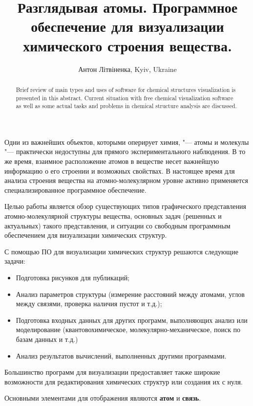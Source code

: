 \documentclass[10pt, a5paper]{article}
\begin{document}
\title{Разглядывая атомы. Программное обеспечение для визуализации химического строения вещества.}
\author{Антон Літвіненка, Kyiv, Ukraine}
\maketitle
\begin{abstract}
Brief review of main types and uses of software for chemical structures visualization is presented in this abstract. Current situation with free chemical visualization software as well as some actual tasks and problems in chemical structure analysis are discussed.
\end{abstract}
Одни из важнейших объектов, которыми оперирует химия, "--- атомы и молекулы "--- практически недоступны для прямого экспериментального наблюдения. В то же время, взаимное расположение атомов в веществе несет важнейшую информацию о его строении и возможных свойствах. В настоящее время для анализа строения вещества на атомно-молекулярном уровне активно применяется специализированное программное обеспечение.

Целью работы является обзор существующих типов графического представления атомно-молекулярной структуры вещества, основных задач (решенных и актуальных) такого представления, и ситуации со свободным программным обеспечением для визуализации химических структур.

С помощью ПО для визуализации химических структур решаются следующие задачи:

\begin{itemize}
  \item Подготовка рисунков для публикаций;
  \item Анализ параметров структуры (измерение расстояний между атомами, углов между связями, проверка наличия пустот и т.д.);
  \item Подготовка входных данных для других программ, выполняющих анализ или моделирование (квантовохимическое, \linebreak молекулярно-механическое, поиск по базам данных и т.д.)
  \item Анализ результатов вычислений, выполненных другими программами.
\end{itemize}

Большинство программ для визуализации предоставляет также широкие возможности для редактирования химических структур или создания их с нуля.

Основными элементами для отображения являются \textbf{атом} и \linebreak\textbf{связь}.
\end{document}
